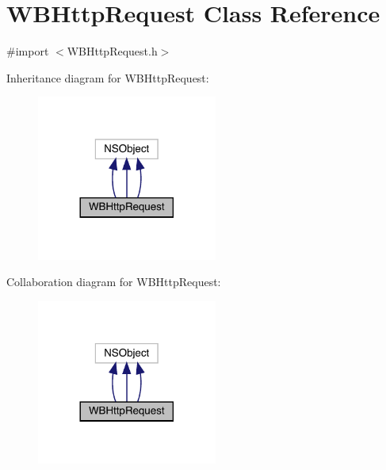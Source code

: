 \hypertarget{interface_w_b_http_request}{}\section{W\+B\+Http\+Request Class Reference}
\label{interface_w_b_http_request}


{\ttfamily \#import $<$W\+B\+Http\+Request.\+h$>$}



Inheritance diagram for W\+B\+Http\+Request\+:\nopagebreak
\begin{figure}[H]
\begin{center}
\leavevmode
\includegraphics[width=168pt]{interface_w_b_http_request__inherit__graph}
\end{center}
\end{figure}


Collaboration diagram for W\+B\+Http\+Request\+:\nopagebreak
\begin{figure}[H]
\begin{center}
\leavevmode
\includegraphics[width=168pt]{interface_w_b_http_request__coll__graph}
\end{center}
\end{figure}
